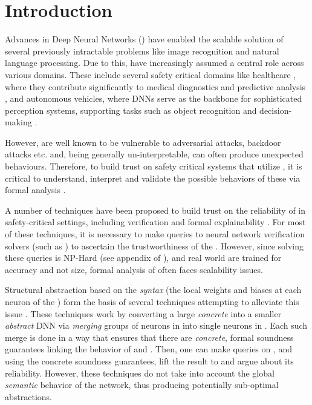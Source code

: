
\section{Introduction}


Advances in Deep Neural Networks (\dnn) have enabled the scalable solution
of several previously intractable problems like image recognition and natural
language processing. Due to this, \dnn have increasingly assumed a central
role across various domains. These include several safety critical domains like
healthcare \cite{b1}, where they contribute significantly to medical diagnostics
and predictive analysis \cite{b2}, and autonomous vehicles, where DNNs serve as
the backbone for sophisticated perception systems, supporting tasks such as
object recognition and decision-making \cite{b3}. 

However, \dnn are well known to be vulnerable to adversarial
attacks\cite{l-bfgs, fgsm, deep-fool, pgd, ground-truth-adv-attack, cw-attack},
backdoor attacks \cite{backdoor-poisoning} etc.  and, being generally
un-interpretable, can often produce 
unexpected behaviours. Therefore, to build trust on safety critical systems 
that utilize \dnn, it is  critical to understand, interpret 
and validate the possible behaviors of these \dnn via formal analysis
\cite{overview-fxai, minimal-image-fxai, backdoor-verification, nn-lander-verif,
camera-verif-dsouza, generalization-verif}.

A number of techniques have been proposed to build trust on the reliability
of \dnn in safety-critical settings, including verification \cite{reluplex,
deeppoly, crown, beta-crown, cegar-nn}  and formal
explainability \cite{overview-fxai, minimal-image-fxai}. For most of these
techniques, it is necessary to make queries to neural
network verification solvers (such as \cite{reluplex, beta-crown}) to ascertain
the trustworthiness of the \dnn.
 However, since solving these queries is NP-Hard (see appendix of
\cite{reluplex}), and real world \dnn are trained for accuracy and not 
size, formal analysis of \dnn often faces scalability issues.

Structural abstraction based on the \textit{syntax} (the local weights and
biases at each
neuron of the \dnn) form the basis of several techniques attempting to alleviate
this issue \cite{cegar-nn, cegarette, cleverest-nn, conv-abs-gk}. These
techniques work by converting a large \textit{concrete} \dnn \cnc into a smaller
\textit{abstract} DNN \abs via \textit{merging} groups of neurons in \cnc into
single neurons in \abs. Each such
merge is done in a way that ensures that there are \textit{concrete}, formal
soundness guarantees linking the behavior of \cnc and \abs. Then, one can make 
queries on \abs, and using the concrete soundness guarantees, lift the result to 
\cnc and argue about its reliability. However, these techniques
do not take into account the global \textit{semantic} behavior of the network,
thus producing potentially sub-optimal abstractions.

